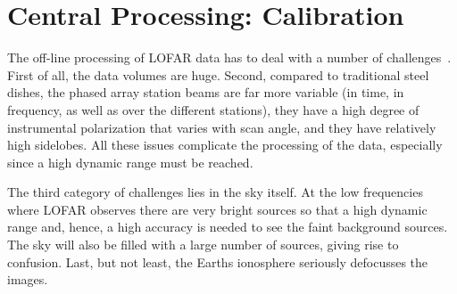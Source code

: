 \documentclass[journal]{IEEEtran}
\begin{document}


\section{Central Processing: Calibration}

The off-line processing of LOFAR data has to deal with a number of challenges~\cite{Noordam:04,Nijboer:07}. First of all, the data volumes are huge. Second, compared to traditional steel dishes, the phased array station beams are far more variable (in time, in frequency, as well as over the different stations), they have a high degree of instrumental polarization that varies with scan angle, and they have relatively high sidelobes. All these issues complicate the processing of the data, especially since a high dynamic range must be reached. 

The third category of challenges lies in the sky itself. At the low frequencies where LOFAR observes there are very bright sources so that a high dynamic range and, hence, a high accuracy is needed to see the faint background sources. The sky will also be filled with a large number of sources, giving rise to confusion. Last, but not least, the Earths ionosphere seriously defocusses the images.
\end{document}
